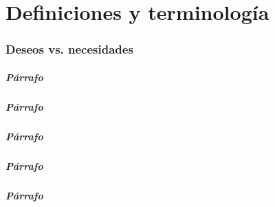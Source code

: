 \ifdefined\maindoc\else

\fi

\chapter{\textbf{Definiciones} y terminología}


\subsection*{Deseos vs. \textbf{necesidades}}
\blindtext

\paragraph{Párrafo}
\blindtext


\paragraph{Párrafo}
\blindtext

\paragraph{Párrafo}
\blindtext

\paragraph{Párrafo}
\blindtext

\paragraph{Párrafo}
\blindtext


\ifdefined\maindoc\else

\fi